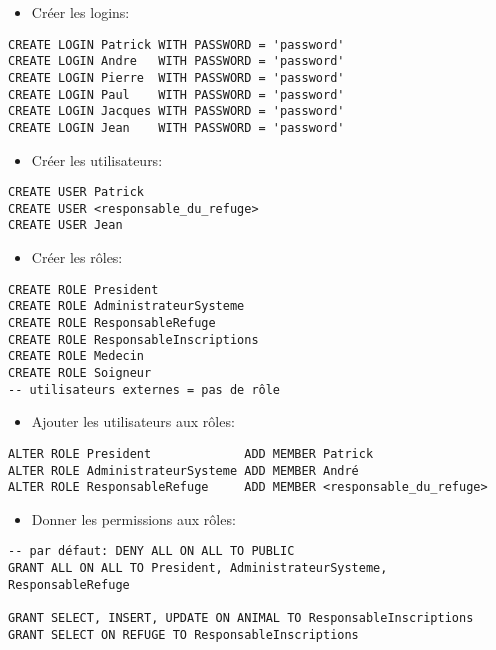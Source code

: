 \documentclass[a4paper]{article}
\begin{document}
\begin{itemize}
\begin{enumerate}
\begin{example}
\begin{itemize} \item Créer les logins: \end{itemize}
\begin{verbatim}
CREATE LOGIN Patrick WITH PASSWORD = 'password'
CREATE LOGIN Andre   WITH PASSWORD = 'password'
CREATE LOGIN Pierre  WITH PASSWORD = 'password'
CREATE LOGIN Paul    WITH PASSWORD = 'password'
CREATE LOGIN Jacques WITH PASSWORD = 'password'
CREATE LOGIN Jean    WITH PASSWORD = 'password'
\end{verbatim}

\begin{itemize} \item Créer les utilisateurs: \end{itemize}
\begin{verbatim}
CREATE USER Patrick
CREATE USER <responsable_du_refuge>
CREATE USER Jean
\end{verbatim}

\begin{itemize} \item Créer les rôles: \end{itemize}
\begin{verbatim}
CREATE ROLE President
CREATE ROLE AdministrateurSysteme
CREATE ROLE ResponsableRefuge
CREATE ROLE ResponsableInscriptions
CREATE ROLE Medecin
CREATE ROLE Soigneur
-- utilisateurs externes = pas de rôle
\end{verbatim}

\begin{itemize} \item Ajouter les utilisateurs aux rôles: \end{itemize}
\begin{verbatim}
ALTER ROLE President             ADD MEMBER Patrick
ALTER ROLE AdministrateurSysteme ADD MEMBER André
ALTER ROLE ResponsableRefuge     ADD MEMBER <responsable_du_refuge>
\end{verbatim}

\begin{itemize} \item Donner les permissions aux rôles: \end{itemize}
\begin{verbatim}
-- par défaut: DENY ALL ON ALL TO PUBLIC
GRANT ALL ON ALL TO President, AdministrateurSysteme, ResponsableRefuge

GRANT SELECT, INSERT, UPDATE ON ANIMAL TO ResponsableInscriptions
GRANT SELECT ON REFUGE TO ResponsableInscriptions


\end{verbatim}
\end{example}
\end{enumerate}
\end{itemize}
\end{document}
